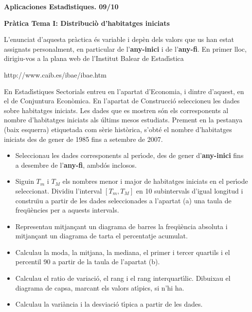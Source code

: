 \documentclass[11pt]{article}
\begin{document}
\begin{center}
\textbf{{\large{Aplicaciones Estad\'{\i}stiques.  09/10}}}

\vspace{0.5cm}

\textbf{Pr\`atica Tema I: Distribuci\`o d'habitatges iniciats}
\end{center} 

L'enunciat d'aquesta pr\`actica \'es variable i dep\`en dels valors que us han estat assignats personalment, en particular de l'\textbf{any-inici} i de l'\textbf{any-fi}. En primer lloc, dirigiu-vos a la plana web de l'Institut Balear de Estad\'{\i}stica 
\begin{center}
http://www.caib.es/ibae/ibae.htm
\end{center}
En Estad\'{\i}stiques Sectorials entreu en l'apartat d'Economia, i dintre d'aquest, en el de Conjuntura Econ\`omica. En l'apartat de Construcci\'o seleccioneu les dades sobre habitatges iniciats. Les dades que es mostren s\'on els corresponents al nombre d'habitatges iniciats als \'ultims mesos estudiats. Prement en la pestanya (baix esquerra) etiquetada com s\`erie hist\`orica, s'obt\'e el nombre d'habitatges iniciats des de gener de 1985 fins a setembre de 2007.

\begin{itemize}
\item [(a)] Seleccionau les dades corresponents al per\'{\i}ode, des de gener d'\textbf{any-inici} fins a desembre de l'\textbf{any-fi}, ambd\'os inclosos.
\item [(b)] Siguin $T_m$ i $T_M$ els nombres menor i major de habitatges iniciats en el per\'{\i}ode seleccionat. Dividiu l'interval $[T_m,T_M]$ en 10 subintervals d'igual longitud i constru\"{\i}u a partir de les dades seleccionades a l'apartat (a) una taula de freq\"u\`encies per a aquests intervals.
\item [(c)] Representau mitjan\c{c}ant un diagrama de barres la freq\"u\`encia absoluta i mitjan\c{c}ant un diagrama de 
tarta el percentatje acumulat.
\item [(d)] Calculau la moda, la mitjana, la mediana, el primer i tercer quartils i el percentil
90 a partir de la taula de l'apartat (b).
\item [(e)] Calculau el ratio de variaci\'o, el rang i el rang interquart\'{\i}lic. Dibuixau el diagrama de capsa, marcant els valors at\'{\i}pics, si n'hi ha. 
\item [(f)] Calculau la vari\`ancia i la desviaci\'o t\'{\i}pica a partir de les dades.
\end{itemize}
\end{document}
